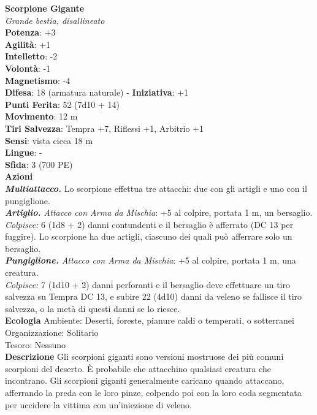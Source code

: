 \begin{multicols}{2}
\medskip\textbf{Scorpione Gigante}\\
\emph{Grande bestia, disallineato}\\
\textbf{Potenza}: +3\\
\textbf{Agilità}: +1\\
\textbf{Intelletto}: -2\\
\textbf{Volontà}: -1\\
\textbf{Magnetismo}: -4\\
\textbf{Difesa}: 18 (armatura naturale) - \textbf{Iniziativa}: +1\\
\textbf{Punti Ferita}: 52 (7d10 + 14)\\
\textbf{Movimento}: 12 m\\
\textbf{Tiri Salvezza}: Tempra +7, Riflessi +1, Arbitrio +1\\
\textbf{Sensi}: vista cieca 18 m\\
\textbf{Lingue}: -\\
\textbf{Sfida}: 3 (700 PE)\smallskip\\
\smallskip\textbf{Azioni}\\
\emph{\textbf{Multiattacco.}} Lo scorpione effettua tre attacchi: due con gli artigli e uno con il pungiglione.\\
\emph{\textbf{Artiglio.} Attacco con Arma da Mischia}: +5 al colpire, portata 1 m, un bersaglio.\\
\emph{Colpisce:} 6 (1d8 + 2) danni contundenti e il bersaglio è afferrato (DC  13 per fuggire). Lo scorpione ha due artigli, ciascuno dei quali può afferrare solo un bersaglio.\\
\emph{\textbf{Pungiglione.} Attacco con Arma da Mischia}: +5 al colpire, portata 1 m, una creatura.\\
\emph{Colpisce:} 7 (1d10 + 2) danni perforanti e il bersaglio deve effettuare un tiro salvezza su Tempra DC  13, e subire 22 (4d10) danni da veleno se fallisce il tiro salvezza, o la metà di questi danni se lo riesce.\\
\textbf{Ecologia}
Ambiente: Deserti, foreste, pianure caldi o temperati, o sotterranei\\
Organizzazione: Solitario\\
Tesoro: Nessuno\\
\textbf{Descrizione}
Gli scorpioni giganti sono versioni mostruose dei più comuni scorpioni del deserto. È probabile che attacchino qualsiasi creatura che incontrano. Gli scorpioni giganti generalmente caricano quando attaccano, afferrando la preda con le loro pinze, colpendo poi con la loro coda segmentata per uccidere la vittima con un’iniezione di veleno.\\


\end{multicols}
